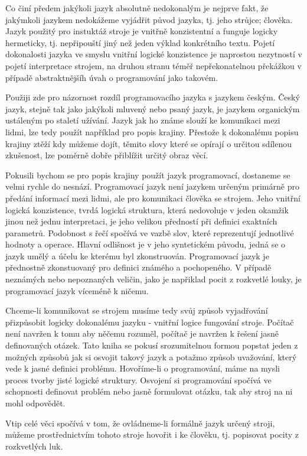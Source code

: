 \documentclass[11pt]{article} %
\begin{document}
Co činí předem jakýkoli jazyk absolutně nedokonalým je nejprve fakt, že jakýmkoli jazykem nedokážeme vyjádřit původ jazyka, tj. jeho strůjce; člověka. Jazyk použitý pro instuktáž stroje je vnitřně konzistentní a funguje logicky hermeticky, tj. nepřipouští jiný než jeden výklad konkrétního textu. Pojetí dokonalosti jazyka ve smyslu vnitřní logické konzistence je naprostou nezytností v pojetí interpretace strojem, na druhou stranu téměř nepřekonatelnou překážkou v případě abstraktnějšíh úvah o programování jako takovém.

Použiji zde pro názornost rozdíl programovacího jazyka s jazykem českým. Český jazyk, stejně tak jako jakýkoli mluvený nebo psaný jazyk, je jazykem organickým ustáleným po staletí užívání. Jazyk jak ho známe slouží ke komunikaci mezi lidmi, lze tedy použít například pro popis krajiny. Přestože k dokonalému popisu krajiny ztěží kdy můžeme dojít, těmito slovy které se opírají o určitou sdílenou zkušenost, lze poměrně dobře přiblížit určitý obraz věcí.

Pokusili bychom se pro popis krajiny použít jazyk programovací, dostaneme se velmi rychle do nesnází. Programovací jazyk není jazykem určeným primárně pro předání informací mezi lidmi, ale pro komunikaci člověka se strojem. Jeho vnitřní logická konzistence, tvrdá logická struktura, která nedovoluje v jeden okamžik jinou než jednu interpretaci, je jeho velikou předností při definici exaktních parametrů. Podobnost s řečí spočívá ve vazbě slov, které reprezentují jednotlivé hodnoty a operace. Hlavní odlišnost je v jeho syntetickém původu, jedná se o jazyk umělý a účelu ke kterému byl zkonstruován. Programovací jazyk je přednostně zkonstuovaný pro definici známého a pochopeného. V případě neznámých nebo nepoznaných veličin, jako je napřiklad pocit z rozkvetlé louky, je programovací jazyk víceméně k ničemu. 

Chceme-li komunikovat se strojem musíme tedy svůj způsob vyjadřování přizpůsobit logicky dokonalému jazyku - vnitřní logice fungování stroje. Počítač není navržen k tomu aby něčemu rozuměl, počítač je navržen k řešení jasně definovaných otázek. Tato kniha se pokusí srozumitelnou formou popstat jeden z možných způsobů jak si osvojit takový jazyk a potažmo způsob uvažování, který vede k jasné definici problému. Hovoříme-li o programování, máme na mysli proces tvorby jisté logické struktury. Osvojení si programování spočívá ve schopnosti definovat problém nebo jasně formulovat otázku, tak aby stroj na ni mohl odpovědět.

Vtip celé věci spočívá v tom, že ovládneme-li formálně jazyk určený stroji, můžeme prostřednictvím tohoto stroje hovořit i ke člověku, tj. popisovat pocity z rozkvetlých luk.
\end{document}
